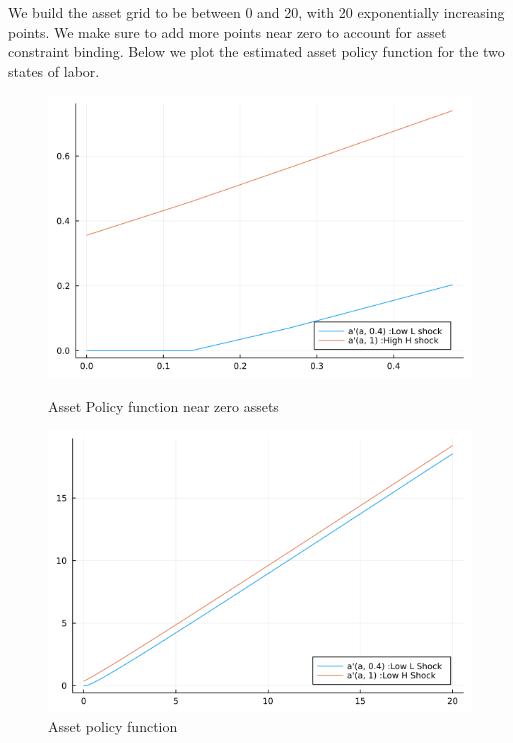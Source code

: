 \documentclass[12pt]{article}
\begin{document}
We build the asset grid to be between 0 and 20, with 20 exponentially increasing points. We make sure to add more points near zero to account for asset constraint binding. Below we plot the estimated asset policy function for the two states of labor.\\
\newpage

\begin{figure}[h]
    \centering
    \begin{minipage}{0.45\textwidth}
        \centering
        \includegraphics[width=1\textwidth]{a_policy_aiyagari.png} %
        \caption{Asset Policy function near zero assets}
    \end{minipage}\hfill
    \begin{minipage}{0.45\textwidth}
        \centering
        \includegraphics[width=1\textwidth]{a_policy_aiyagari_new.png} %
        \caption{Asset policy function}
    \end{minipage}
\end{figure}
\end{document}

